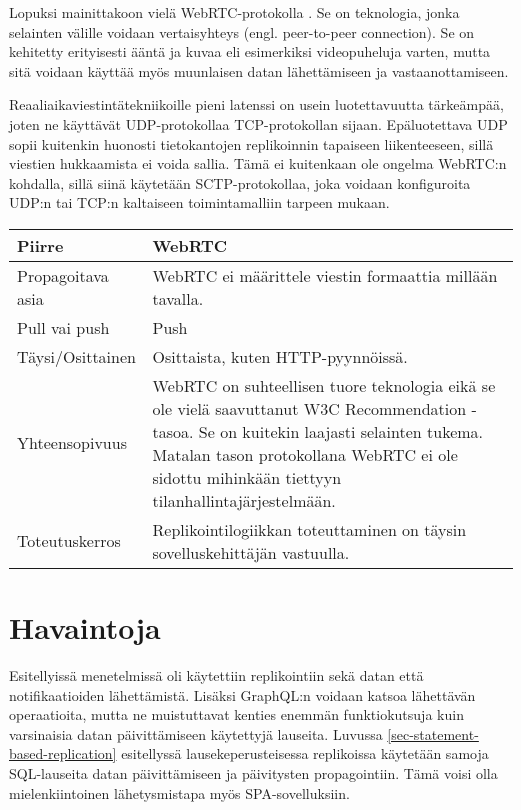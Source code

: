\documentclass[finnish,twoside,censored,csm,sw-track-2018]{HYthesisML}
\begin{document}
Lopuksi mainittakoon vielä WebRTC-protokolla \citep{websocket-rfc}. Se on teknologia, jonka selainten välille voidaan vertaisyhteys (engl. peer-to-peer connection). Se on kehitetty erityisesti ääntä ja kuvaa eli esimerkiksi videopuheluja varten, mutta sitä voidaan käyttää myös muunlaisen datan lähettämiseen ja vastaanottamiseen.

Reaaliaikaviestintätekniikoille pieni latenssi on usein luotettavuutta tärkeämpää, joten ne käyttävät UDP-protokollaa TCP-protokollan sijaan. Epäluotettava UDP sopii kuitenkin huonosti tietokantojen replikoinnin tapaiseen liikenteeseen, sillä viestien hukkaamista ei voida sallia. Tämä ei kuitenkaan ole ongelma WebRTC:n kohdalla, sillä siinä käytetään SCTP-protokollaa, joka voidaan konfiguroita UDP:n tai TCP:n kaltaiseen toimintamalliin tarpeen mukaan.

\begin{center}
\begin{tabular}{ | m{3.3cm} | m{11.7cm} | }
 \hline
 \textbf{Piirre} & \textbf{WebRTC}\\ 
 \hline
 Propagoitava asia & WebRTC ei määrittele viestin formaattia millään tavalla. \\
 \hline
 Pull vai push & Push\\
 \hline
 Täysi/Osittainen & Osittaista, kuten HTTP-pyynnöissä. \\
 \hline
 Yhteensopivuus & WebRTC on suhteellisen tuore teknologia eikä se ole vielä saavuttanut W3C Recommendation -tasoa. Se on kuitekin laajasti selainten tukema. Matalan tason protokollana WebRTC ei ole sidottu mihinkään tiettyyn tilanhallintajärjestelmään.\\
 \hline
 Toteutuskerros & Replikointilogiikkan toteuttaminen on täysin sovelluskehittäjän vastuulla. \\
 \hline
\end{tabular}
\label{table-webrtc}
\end{center}

\section{Havaintoja}

Esitellyissä menetelmissä oli käytettiin replikointiin sekä datan että notifikaatioiden lähet\-tämistä. Lisäksi GraphQL:n voidaan katsoa lähettävän operaatioita, mutta ne muistuttavat kenties enemmän funktiokutsuja kuin varsinaisia datan päivittämiseen käytettyjä lauseita. Luvussa \ref{sec-statement-based-replication} esitellyssä lausekeperusteisessa replikoissa käytetään samoja SQL-lauseita datan päivittämiseen ja päivitysten propagointiin. Tämä voisi olla mielenkiintoinen lähetysmistapa myös SPA-sovelluksiin.
\end{document}
